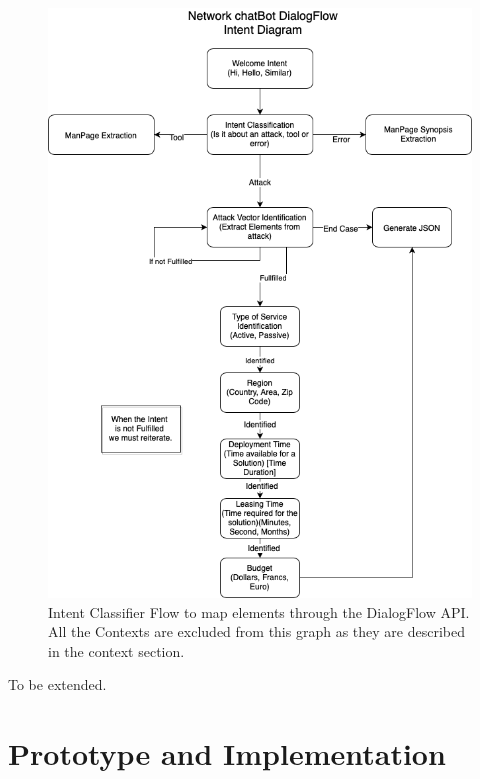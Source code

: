 \begin{figure}[!ht]
    \centering
    \includegraphics[scale=0.60]{MA-BA-Thesis/IntentFlow.png}
    \caption{Intent Classifier Flow to map elements through the DialogFlow API. All the Contexts are excluded from this graph as they are described in the context section.}
    \label{fig:intentFlow}
\end{figure}

To be extended.

\chapter{Prototype and Implementation}
